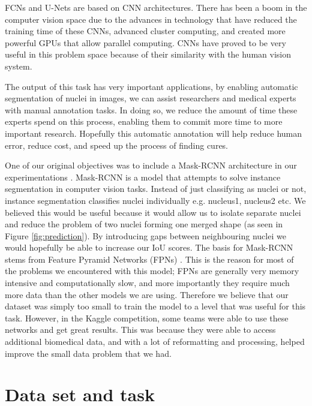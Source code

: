\documentclass{article}
\begin{document}
FCNs and U-Nets are based on CNN architectures. There has been a boom in the computer vision space due to the advances in technology that have reduced the training time of these CNNs, advanced cluster computing, and created more powerful GPUs that allow parallel computing. CNNs have proved to be very useful in this problem space \citep{historyAlexNet} because of their similarity with the human vision system.

The output of this task has very important applications, by enabling automatic segmentation of nuclei in images, we can assist researchers and medical experts with manual annotation tasks. In doing so, we reduce the amount of time these experts spend on this process, enabling them to commit more time to more important research. Hopefully this automatic annotation will help reduce human error, reduce cost, and speed up the process of finding cures.

One of our original objectives was to include a Mask-RCNN architecture in our experimentations \cite{MaskRCNN}. Mask-RCNN is a model that attempts to solve instance segmentation in computer vision tasks. Instead of just classifying as nuclei or not, instance segmentation classifies nuclei individually e.g. nucleus1, nucleus2 etc. We believed this would be useful because it would allow us to isolate separate nuclei and reduce the problem of two nuclei forming one merged shape (as seen in Figure \ref{fig:prediction}). By introducing gaps between neighbouring nuclei we would hopefully be able to increase our IoU scores. The basis for Mask-RCNN stems from Feature Pyramid Networks (FPNs) \cite{Lin2017FeaturePN}. This is the reason for most of the problems we encountered with this model; FPNs are generally very memory intensive and computationally slow, and more importantly they require much more data than the other models we are using. Therefore we believe that our dataset was simply too small to train the model to a level that was useful for this task. However, in the Kaggle competition, some teams were able to use these networks and get great results. This was because they were able to access additional biomedical data, and with a lot of reformatting and processing, helped improve the small data problem that we had.

\section{Data set and task} 
\end{document}
